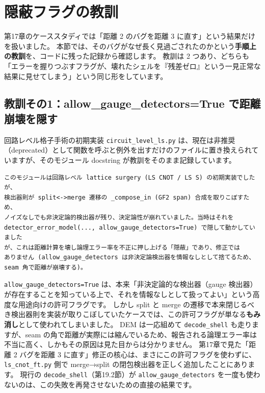 \section{隠蔽フラグの教訓}\label{sec:flag_lesson}

第17章のケーススタディでは「距離 2 のバグを距離 3 に直す」という結果だけを扱いました。
本節では、そのバグがなぜ長く見過ごされたのかという\textbf{手順上の教訓}を、コードに残った記録から確認します。
教訓は 2 つあり、どちらも「エラーを握りつぶすフラグが、壊れたシェルを『残差ゼロ』という一見正常な結果に見せてしまう」という同じ形をしています。

\subsection{教訓その1：allow\_gauge\_detectors=True で距離崩壊を隠す}

回路レベル格子手術の初期実装 \texttt{circuit\_level\_ls.py} は、現在は非推奨（deprecated）として関数を呼ぶと例外を出すだけのファイルに置き換えられていますが、そのモジュール docstring が教訓をそのまま記録しています。

\begin{lstlisting}[language={}, caption={src/stages/02\_circuit\_level/src/ftqc/circuit\_level\_ls.py（非推奨化された旧実装の docstring より抜粋）}]
このモジュールは回路レベル lattice surgery (LS CNOT / LS S) の初期実装でしたが、
検出器則が split<->merge 遷移の _compose_in (GF2 span) 合成を取りこぼすため、
ノイズなしでも非決定論的検出器が残り、決定論性が崩れていました。当時はそれを
detector_error_model(..., allow_gauge_detectors=True) で隠して動かしていました
が、これは距離計算を壊し論理エラー率を不正に押し上げる「隠蔽」であり、修正では
ありません (allow_gauge_detectors は非決定論検出器を情報なしとして捨てるため、
seam 角で距離が崩壊する)。
\end{lstlisting}

\texttt{allow\_gauge\_detectors=True} は、本来「非決定論的な検出器（gauge 検出器）が存在することを知っている上で、それを情報なしとして扱ってよい」という高度な用途向けの許可フラグです。
しかし split と merge の遷移で本来閉じるべき検出器則を実装が取りこぼしていたケースでは、この許可フラグが単なる\textbf{もみ消し}として使われてしまいました。
DEM は一応組めて \texttt{decode\_shell} も走りますが、seam の角で距離が実際には縮んでいるため、報告される論理エラー率は不当に高く、しかもその原因は見た目からは分かりません。
第17章で見た「距離 2 バグを距離 3 に直す」修正の核心は、まさにこの許可フラグを使わずに、\texttt{ls\_cnot\_ft.py} 側で merge→split の閉包検出器を正しく追加したことにあります。
現行の \texttt{decode\_shell}（第19.2節）が \texttt{allow\_gauge\_detectors} を一度も使わないのは、この失敗を再発させないための直接の結果です。

